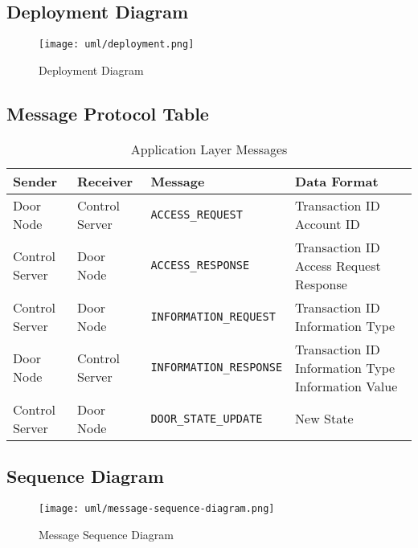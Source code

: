 
\subsection{Deployment Diagram}

\begin{figure}[!htb]
\centering
\texttt{[image: uml/deployment.png]}
\caption{Deployment Diagram}
\label{fig:deployment-diagram}
\end{figure}

\subsection{Message Protocol Table}

\begin{table*}[htb]
\begin{tabular}{ l | l | l | p{4.5cm} }
\toprule
Sender & Receiver & Message & Data Format\\
\midrule
Door Node & Control Server & \verb|ACCESS_REQUEST| &
Transaction ID \newline Account ID\\
\hline
Control Server & Door Node & \verb|ACCESS_RESPONSE| &
Transaction ID \newline Access Request Response\\
\hline
Control Server & Door Node & \verb|INFORMATION_REQUEST| &
Transaction ID \newline Information Type\\
\hline
Door Node & Control Server & \verb|INFORMATION_RESPONSE| &
Transaction ID \newline Information Type \newline Information Value\\
\hline
Control Server & Door Node & \verb|DOOR_STATE_UPDATE| & New State\\
\bottomrule
\end{tabular}
\caption{Application Layer Messages}
\label{tab:app-layer-messages}
\end{table*}

\subsection{Sequence Diagram}

\begin{figure}[!htb]
\centering
\texttt{[image: uml/message-sequence-diagram.png]}
\caption{Message Sequence Diagram}
\label{fig:message-sequence-diagram}
\end{figure}
